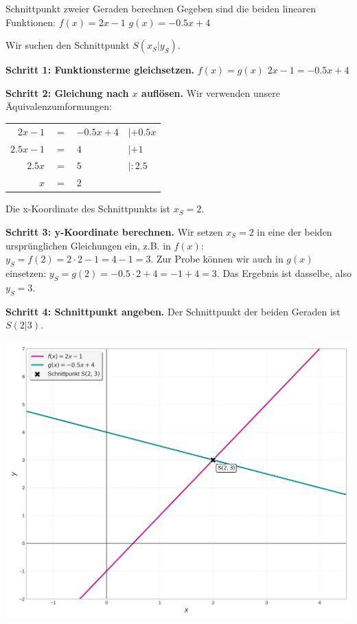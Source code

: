 \begin{beispielumgebung}{Schnittpunkt zweier Geraden berechnen}
Gegeben sind die beiden linearen Funktionen:
$f(x) = 2x - 1$
$g(x) = -0.5x + 4$

Wir suchen den Schnittpunkt $S(x_S|y_S)$.

\textbf{Schritt 1: Funktionsterme gleichsetzen.}
$f(x) = g(x)$
$2x - 1 = -0.5x + 4$

\textbf{Schritt 2: Gleichung nach $x$ auflösen.}
Wir verwenden unsere Äquivalenzumformungen:
\begin{center}
\begin{tabular}{r @{\,} c @{\,} l @{\quad\quad} l}
$2x - 1$ & $=$ & $-0.5x + 4$ & $| +0.5x$ \\
$2.5x - 1$ & $=$ & $4$ & $| +1$ \\
$2.5x$ & $=$ & $5$ & $| :2.5$ \\
$x$ & $=$ & $2$ & \\
\end{tabular}
\end{center}
Die x-Koordinate des Schnittpunkts ist $x_S = 2$.

\textbf{Schritt 3: y-Koordinate berechnen.}
Wir setzen $x_S=2$ in eine der beiden ursprünglichen Gleichungen ein, z.B. in $f(x)$:
$y_S = f(2) = 2 \cdot 2 - 1 = 4 - 1 = 3$.
Zur Probe können wir auch in $g(x)$ einsetzen:
$y_S = g(2) = -0.5 \cdot 2 + 4 = -1 + 4 = 3$.
Das Ergebnis ist dasselbe, also $y_S=3$.

\textbf{Schritt 4: Schnittpunkt angeben.}
Der Schnittpunkt der beiden Geraden ist $S(2|3)$.

\begin{center}
    \includegraphics[scale = 0.5]{grafiken/Schnittpunkt_Zweier_Geraden.png}
    \label{fig:schnittpunkt_geraden_bsp}
\end{center}

\end{beispielumgebung}

